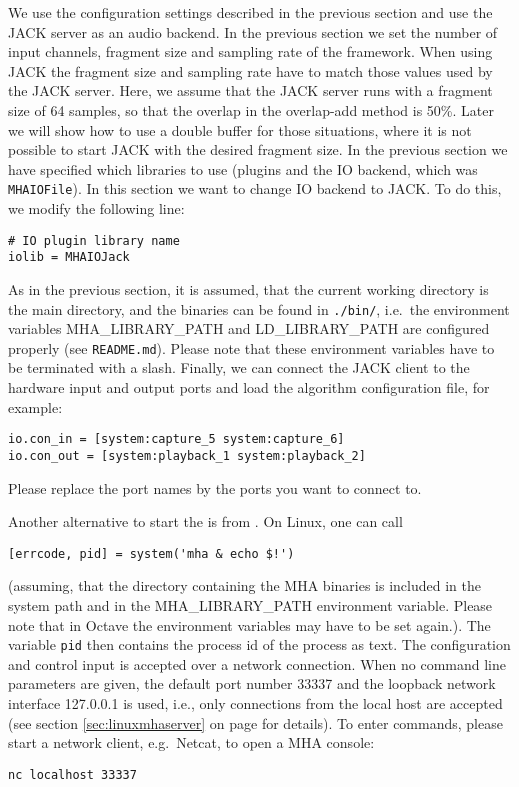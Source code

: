 We use the configuration settings described in the previous section 
and use the JACK server as an audio backend. In the previous section we set the number of 
input channels, fragment size and sampling rate of the framework. 
When using JACK the fragment size
and sampling rate have to match those values used by the JACK server.
Here, we assume that the JACK server runs with a fragment size
of 64 samples, so that the overlap in the overlap-add method is
50\%. Later we will show how to use a double buffer for those
situations, where it is not possible to start JACK with the desired
fragment size. 
In the previous section we have specified which libraries to use 
(plugins and the IO backend, which was \verb!MHAIOFile!). In this section 
we want to change IO backend to JACK. 
%
To do this, we modify the following line:
\begin{verbatim}
# IO plugin library name
iolib = MHAIOJack
\end{verbatim}
%
As in the previous section, it is assumed, that the current working directory is the main \mha{} directory, and the 
binaries can be found in \verb!./bin/!, i.e.\ the environment variables 
MHA\_LIBRARY\_PATH and LD\_LIBRARY\_PATH are configured
properly (see \verb!README.md!).
%
Please note that these environment variables have to be
terminated with a slash.
%
Finally, we can connect the JACK client to the hardware input and
output ports and load the algorithm configuration file, for example:
\begin{verbatim}
io.con_in = [system:capture_5 system:capture_6]
io.con_out = [system:playback_1 system:playback_2]
\end{verbatim}
Please replace the port names by the ports you want to connect
to.
%

Another alternative to start the \mhad{} is from \Matlab{}. On Linux, one can call
\begin{verbatim}
[errcode, pid] = system('mha & echo $!')
\end{verbatim}
(assuming, that the directory containing the MHA binaries is included
in the system path and in the MHA\_LIBRARY\_PATH environment
variable. Please note that in Octave the environment variables 
may have to be set again.).
%
The variable \verb!pid! then contains the process id of the \mhad{} process as text.
%
The \mha{} configuration and control
input is accepted over a network connection. 
%
When no command line parameters are given, the default port number
33337 and the loopback network interface 127.0.0.1 is used, i.e., only
connections from the local host are accepted (see section
\ref{sec:linuxmhaserver} on page \pageref{sec:linuxmhaserver} for
details).
%
To enter \mha{} commands, please start a network client, e.g.\ Netcat, to
open a MHA console:
\begin{verbatim}nc localhost 33337\end{verbatim}

